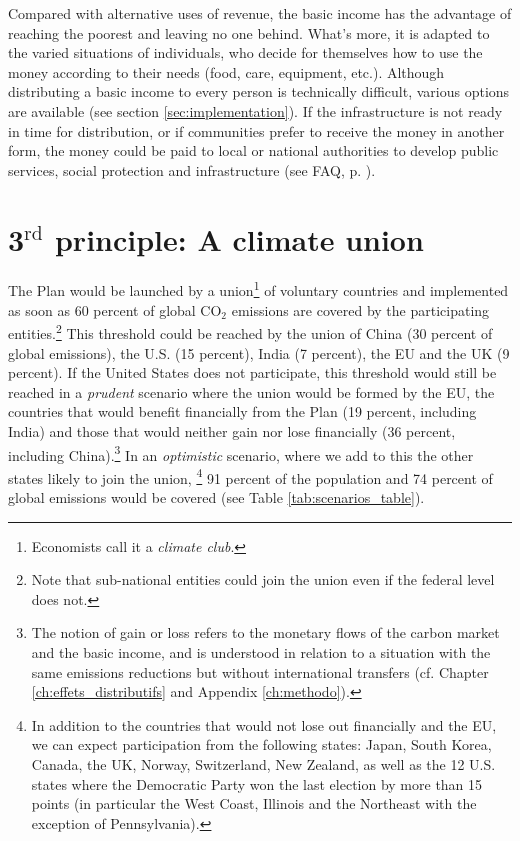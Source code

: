 \documentclass[a5paper,english,openany]{memoir}
\begin{document}
Compared with alternative uses of revenue, the basic income has the advantage of reaching the poorest and leaving no one behind. What's more, it is adapted to the varied situations of individuals, who decide for themselves how to use the money according to their needs (food, care, equipment, etc.). 
Although distributing a basic income to every person is technically difficult, various options are available %
(see section \ref{sec:implementation}). If the infrastructure is not ready in time for distribution, or if communities prefer to receive the money in another form, the money could be paid to local or national authorities to develop public services, social protection and infrastructure (see FAQ, p. \pageref{q:rdb}). 

\section*{3$^\text{rd}$ principle: A climate union}

The Plan would be launched by a union\footnote{Economists call it a \textit{climate club}.} of voluntary countries and implemented as soon as 60 percent of global CO$_\text{2}$ emissions are covered by the participating entities.\footnote{Note that sub-national entities could join the union even if the federal level does not.} This threshold could be reached by the union of China (30 percent of global emissions), the U.S. (15 percent), India (7 percent), the EU and the UK (9 percent). If the United States does not participate, this threshold would still be reached in a \textit{prudent} scenario where the union would be formed by the EU, the countries that would benefit financially from the Plan (19 percent, including India) and those that would neither gain nor lose financially (36 percent, including China).\footnote{The notion of gain or loss refers to the monetary flows of the carbon market and the basic income, and is understood in relation to a situation with the same emissions reductions but without international transfers (cf. Chapter \ref{ch:effets_distributifs} and Appendix \ref{ch:methodo}).} %
In an \textit{optimistic} scenario, where we add to this the other states likely to join the union,%
\footnote{In addition to the countries that would not lose out financially and the EU, we can expect participation from the following states: Japan, South Korea, Canada, the UK, Norway, Switzerland, New Zealand, as well as the 12 U.S. states where the Democratic Party won the last election by more than 15 points (in particular the West Coast, Illinois and the Northeast with the exception of Pennsylvania).} 
91 percent of the population and 74 percent of global emissions would be covered (see Table \ref{tab:scenarios_table}). 
\end{document}
